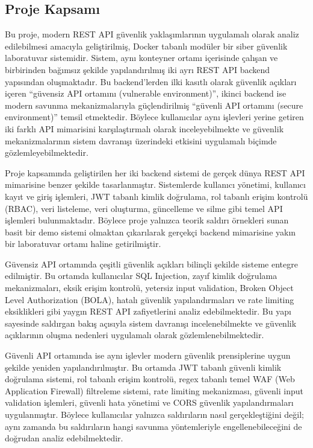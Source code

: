 \subsection{Proje Kapsamı}
\label{proje-kapsam}

Bu proje, modern REST API güvenlik yaklaşımlarının uygulamalı olarak analiz edilebilmesi amacıyla geliştirilmiş, Docker tabanlı modüler bir siber güvenlik laboratuvar sistemidir. Sistem, aynı konteyner ortamı içerisinde çalışan ve birbirinden bağımsız şekilde yapılandırılmış iki ayrı REST API backend yapısından oluşmaktadır. Bu backend’lerden ilki kasıtlı olarak güvenlik açıkları içeren “güvensiz API ortamını (vulnerable environment)”, ikinci backend ise modern savunma mekanizmalarıyla güçlendirilmiş “güvenli API ortamını (secure environment)” temsil etmektedir. Böylece kullanıcılar aynı işlevleri yerine getiren iki farklı API mimarisini karşılaştırmalı olarak inceleyebilmekte ve güvenlik mekanizmalarının sistem davranışı üzerindeki etkisini uygulamalı biçimde gözlemleyebilmektedir.

Proje kapsamında geliştirilen her iki backend sistemi de gerçek dünya REST API mimarisine benzer şekilde tasarlanmıştır. Sistemlerde kullanıcı yönetimi, kullanıcı kayıt ve giriş işlemleri, JWT tabanlı kimlik doğrulama, rol tabanlı erişim kontrolü (RBAC), veri listeleme, veri oluşturma, güncelleme ve silme gibi temel API işlemleri bulunmaktadır. Böylece proje yalnızca teorik saldırı örnekleri sunan basit bir demo sistemi olmaktan çıkarılarak gerçekçi backend mimarisine yakın bir laboratuvar ortamı haline getirilmiştir.

Güvensiz API ortamında çeşitli güvenlik açıkları bilinçli şekilde sisteme entegre edilmiştir. Bu ortamda kullanıcılar SQL Injection, zayıf kimlik doğrulama mekanizmaları, eksik erişim kontrolü, yetersiz input validation, Broken Object Level Authorization (BOLA), hatalı güvenlik yapılandırmaları ve rate limiting eksiklikleri gibi yaygın REST API zafiyetlerini analiz edebilmektedir. Bu yapı sayesinde saldırgan bakış açısıyla sistem davranışı incelenebilmekte ve güvenlik açıklarının oluşma nedenleri uygulamalı olarak gözlemlenebilmektedir.

Güvenli API ortamında ise aynı işlevler modern güvenlik prensiplerine uygun şekilde yeniden yapılandırılmıştır. Bu ortamda JWT tabanlı güvenli kimlik doğrulama sistemi, rol tabanlı erişim kontrolü, regex tabanlı temel WAF (Web Application Firewall) filtreleme sistemi, rate limiting mekanizması, güvenli input validation işlemleri, güvenli hata yönetimi ve CORS güvenlik yapılandırmaları uygulanmıştır. Böylece kullanıcılar yalnızca saldırıların nasıl gerçekleştiğini değil; aynı zamanda bu saldırıların hangi savunma yöntemleriyle engellenebileceğini de doğrudan analiz edebilmektedir.

